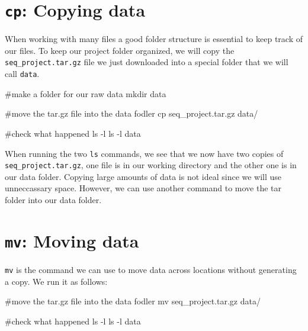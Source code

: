 \documentclass[
  letterpaper,
  DIV=11,
  numbers=noendperiod]{scrreprt}
\newenvironment{Shaded}{}{}
\newcommand{\AttributeTok}[1]{\textcolor[rgb]{0.84,0.23,0.29}{#1}}
\newcommand{\CommentTok}[1]{\textcolor[rgb]{0.42,0.45,0.49}{#1}}
\newcommand{\FunctionTok}[1]{\textcolor[rgb]{0.44,0.26,0.76}{#1}}
\newcommand{\NormalTok}[1]{\textcolor[rgb]{0.14,0.16,0.18}{#1}}
\begin{document}
\section{\texorpdfstring{\texttt{cp}: Copying
data}{cp: Copying data}}\label{cp-copying-data}

When working with many files a good folder structure is essential to
keep track of our files. To keep our project folder organized, we will
copy the \texttt{seq\_project.tar.gz} file we just downloaded into a
special folder that we will call \texttt{data}.

\begin{Shaded}
\begin{Highlighting}[]
\CommentTok{\#make a folder for our raw data}
\FunctionTok{mkdir}\NormalTok{ data}

\CommentTok{\#move the tar.gz file into the data fodler }
\FunctionTok{cp}\NormalTok{ seq\_project.tar.gz data/}

\CommentTok{\#check what happened}
\FunctionTok{ls} \AttributeTok{{-}l}
\FunctionTok{ls} \AttributeTok{{-}l}\NormalTok{ data}
\end{Highlighting}
\end{Shaded}

When running the two \texttt{ls} commands, we see that we now have two
copies of \texttt{seq\_project.tar.gz}, one file is in our working
directory and the other one is in our data folder. Copying large amounts
of data is not ideal since we will use unneccassary space. However, we
can use another command to move the tar folder into our data folder.

\section{\texorpdfstring{\texttt{mv}: Moving
data}{mv: Moving data}}\label{mv-moving-data}

\texttt{mv} is the command we can use to move data across locations
without generating a copy. We run it as follows:

\begin{Shaded}
\begin{Highlighting}[]
\CommentTok{\#move the tar.gz file into the data fodler }
\FunctionTok{mv}\NormalTok{ seq\_project.tar.gz data/}

\CommentTok{\#check what happened}
\FunctionTok{ls} \AttributeTok{{-}l}
\FunctionTok{ls} \AttributeTok{{-}l}\NormalTok{ data}
\end{Highlighting}
\end{Shaded}
\end{document}
